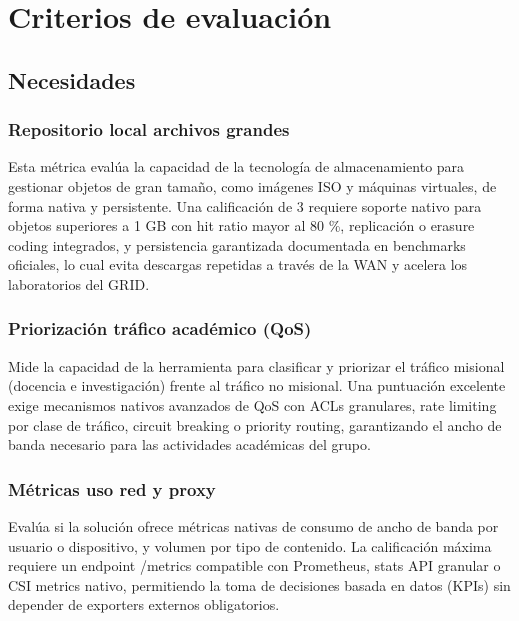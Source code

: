 \section{Criterios de evaluación}\label{sec:criterios}

\subsection{Necesidades}

\subsubsection{Repositorio local archivos grandes}

Esta métrica evalúa la capacidad de la tecnología de almacenamiento para gestionar objetos de gran tamaño, como imágenes ISO y máquinas virtuales, de forma nativa y persistente. Una calificación de 3 requiere soporte nativo para objetos superiores a 1 GB con hit ratio mayor al 80 \%, replicación o erasure coding integrados, y persistencia garantizada documentada en benchmarks oficiales, lo cual evita descargas repetidas a través de la WAN y acelera los laboratorios del GRID.

\subsubsection{Priorización tráfico académico (QoS)}

Mide la capacidad de la herramienta para clasificar y priorizar el tráfico misional (docencia e investigación) frente al tráfico no misional. Una puntuación excelente exige mecanismos nativos avanzados de QoS con ACLs granulares, rate limiting por clase de tráfico, circuit breaking o priority routing, garantizando el ancho de banda necesario para las actividades académicas del grupo.

\subsubsection{Métricas uso red y proxy}

Evalúa si la solución ofrece métricas nativas de consumo de ancho de banda por usuario o dispositivo, y volumen por tipo de contenido. La calificación máxima requiere un endpoint /metrics compatible con Prometheus, stats API granular o CSI metrics nativo, permitiendo la toma de decisiones basada en datos (KPIs) sin depender de exporters externos obligatorios.

